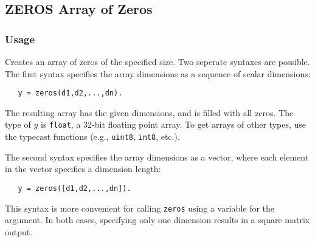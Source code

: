 %
%
%
\subsection{ZEROS Array of Zeros}
\subsubsection{Usage}
Creates an array of zeros of the specified size.  Two seperate 
syntaxes are possible.  The first syntax specifies the array 
dimensions as a sequence of scalar dimensions:
\begin{verbatim}
   y = zeros(d1,d2,...,dn).
\end{verbatim}
The resulting array has the given dimensions, and is filled with
all zeros.  The type of $y$ is \verb|float|, a 32-bit floating
point array.  To get arrays of other types, use the typecast 
functions (e.g., \verb|uint8|, \verb|int8|, etc.).
    
The second syntax specifies the array dimensions as a vector,
where each element in the vector specifies a dimension length:
\begin{verbatim}
   y = zeros([d1,d2,...,dn]).
\end{verbatim}
This syntax is more convenient for calling \verb|zeros| using a 
variable for the argument.  In both cases, specifying only one
dimension results in a square matrix output.
